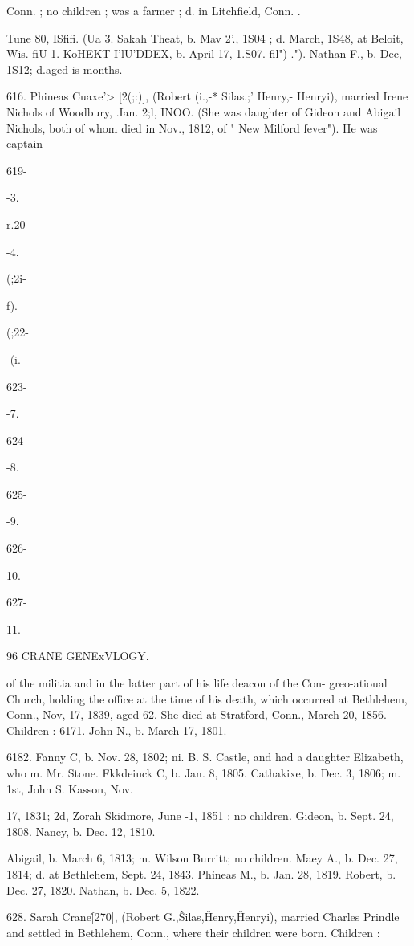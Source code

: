 Conn. ; no children ; was a farmer ; d. in Litchfield, Conn. . 

Tune 80, ISfifi. 
(Ua 3. Sakah Theat, b. Mav 2'., 1S04 ; d. March, 1S48, at Beloit, Wis. 
fiU 1. KoHEKT I'lU'DDEX, b. April 17, 1.S07. 
fil")  ."). Nathan F., b. Dec, 1S12; d.aged is months. 

616. Phineas Cuaxe'> [2(;:)], (Robert (i.,-* Silas.;' Henry,- 
Henryi), married Irene Nichols of Woodbury, .Ian. 2;l, INOO. 
(She was daughter of Gideon and Abigail Nichols, both of whom 
died in Nov., 1812, of " New Milford fever"). He was captain 



619- 


-3. 


r.20- 


-4. 


(;2i- 


 f). 


(;22- 


-(i. 


623- 


-7. 


624- 


-8. 


625- 


-9. 


626- 


10. 


627- 


11. 



96 CRANE GENExVLOGY. 

of the militia and iu the latter part of his life deacon of the Con- 
greo-atioual Church, holding the office at the time of his death, 
which occurred at Bethlehem, Conn., Nov, 17, 1839, aged 62. 
She died at Stratford, Conn., March 20, 1856. Children : 
6171. John N., b. March 17, 1801. 

6182. Fanny C, b. Nov. 28, 1802; ni. B. S. Castle, and had a 
daughter Elizabeth, who m. Mr. Stone. 
Fkkdeiuck C, b. Jan. 8, 1805. 
Cathakixe, b. Dec. 3, 1806; m. 1st, John S. Kasson, Nov. 

17, 1831; 2d, Zorah Skidmore, June -1, 1851 ; no children. 
Gideon, b. Sept. 24, 1808. 
Nancy, b. Dec. 12, 1810. 

Abigail, b. March 6, 1813; m. Wilson Burritt; no children. 
Maey A., b. Dec. 27, 1814; d. at Bethlehem, Sept. 24, 1843. 
Phineas M., b. Jan. 28, 1819. 
Robert, b. Dec. 27, 1820. 
Nathan, b. Dec. 5, 1822. 

628. Sarah Crane\^ [270], (Robert G.,\^ Silas,\^ Henry,\^ 
Henryi), married Charles Prindle and settled in Bethlehem, 
Conn., where their children were born. Children : 

